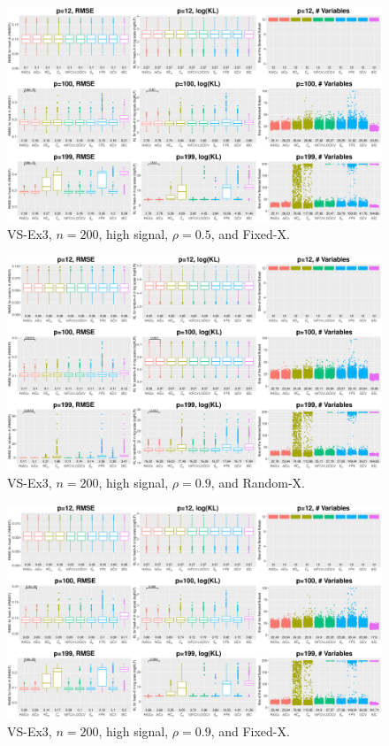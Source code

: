 \begin{figure}[!ht]
\centering
\includegraphics[width=\textwidth]{figures/supplement/fixedx_VS-Ex3_n200_hsnr_rho05.eps}
\caption{VS-Ex3, $n=200$, high signal, $\rho=0.5$, and Fixed-X.}
\end{figure}
\clearpage
\begin{figure}[!ht]
\centering
\includegraphics[width=\textwidth]{figures/supplement/randomx_VS-Ex3_n200_hsnr_rho09.eps}
\caption{VS-Ex3, $n=200$, high signal, $\rho=0.9$, and Random-X.}
\end{figure}
\begin{figure}[!ht]
\centering
\includegraphics[width=\textwidth]{figures/supplement/fixedx_VS-Ex3_n200_hsnr_rho09.eps}
\caption{VS-Ex3, $n=200$, high signal, $\rho=0.9$, and Fixed-X.}
\end{figure}
